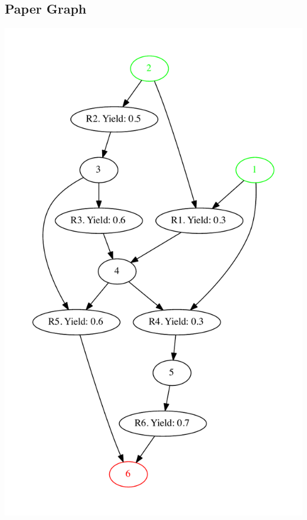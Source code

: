 \documentclass[a4paper,10pt,titlepage]{paper}
\begin{document}
\subsection{Paper Graph}
\centering
\includegraphics[scale=0.4]{TestGrafer/PaperTest.pdf}
\label{Appendix::Paper Graph}
\end{document}
